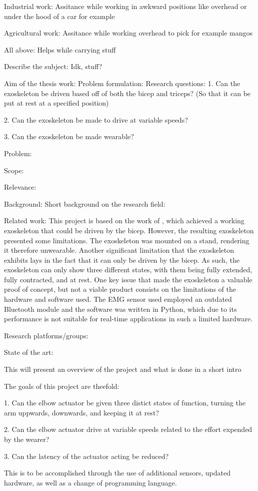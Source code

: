             Industrial work:
                Assitance while working in awkward positions like overhead or under the hood of a car for example

            Agricultural work:
                Assitance while working overhead to pick for example mangos
            
            All above:
                Helps while carrying stuff

    Describe the subject:
        Idk, stuff?

    Aim of the thesis work:
        Problem formulation: %
            Research questions:
                1.	Can the exoskeleton be driven based off of both the bicep and triceps? (So that it can be put at rest at a specified position)

                2.	Can the exoskeleton be made to drive at variable speeds?

                3.	Can the exoskeleton be made wearable?

            Problem:
                

            Scope:
            
            Relevance: %


Background: 
    Short background on the research field:

    Related work: %
        This project is based on the work of \cite{AFES}, which achieved a working exoskeleton that could be driven by the bicep. However, the resulting 
        exoskeleton presented some limitations. The exoskeleton was mounted on a stand, rendering it therefore unwearable. Another significant limitation 
        that the exoskeleton exhibits lays in the fact that it can only be driven by the bicep. As such, the exoskeleton can only show three different states, 
        with them being fully extended, fully contracted, and at rest. One key issue that made the exoskeleton a valuable proof of concept, but not a viable 
        product consists on the limitations of the hardware and software used. The EMG sensor used employed an outdated Bluetooth module and the software was 
        written in Python, which due to its performance is not suitable for real-time applications in such a limited hardware.

    Research platforms/groups:

    State of the art:


    This will present an overview of the project and what is done in a short intro


The goals of this project are theefold:

1. Can the elbow actuator be given three distict states of function, turning the arm uppwards, downwards, and keeping it at rest?

2. Can the elbow actuator drive at variable speeds related to the effort expended by the wearer?

3. Can the latency of the actuator acting be reduced?

This is to be accomplished through the use of additional sensors, updated hardware, as well as a change of programming language.